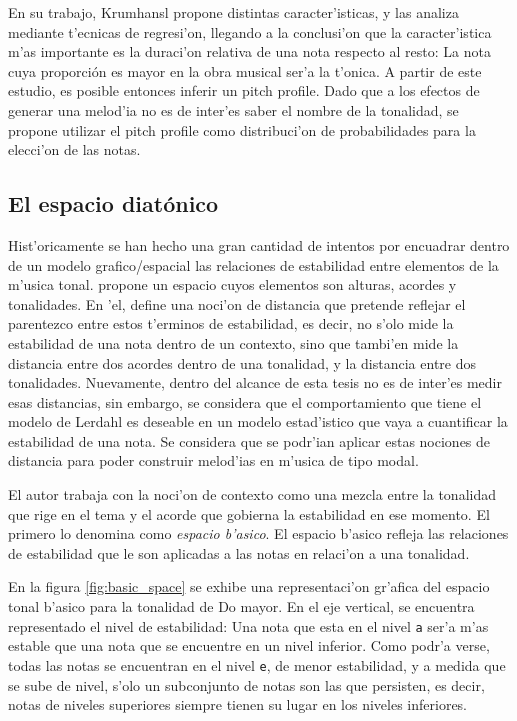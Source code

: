 En su trabajo, Krumhansl propone distintas caracter'isticas, y las analiza mediante t'ecnicas de regresi'on, llegando a la conclusi'on que la
caracter'istica m'as importante es la duraci'on relativa de una nota respecto al resto: La nota cuya proporci\'on es mayor en la obra musical ser'a la t'onica. 
A partir de este estudio, es posible entonces inferir un pitch profile. Dado que a los efectos de generar una melod'ia no es de inter'es saber el nombre de la 
tonalidad, se propone utilizar el pitch profile como distribuci'on de probabilidades para la elecci'on de las notas.

\subsection{El espacio diat\'onico}
Hist'oricamente se han hecho una gran cantidad de intentos por encuadrar dentro de un modelo grafico/espacial las relaciones de estabilidad entre elementos de la m'usica
tonal.  \cite{Lerdahl2001} propone un espacio cuyos elementos son alturas, acordes y tonalidades. En 'el, define una noci'on de distancia que pretende 
reflejar el parentezco entre estos t'erminos de estabilidad, es decir, no s'olo mide la estabilidad de una nota dentro de un contexto, 
sino que tambi'en mide la distancia entre dos acordes dentro de una tonalidad, y la distancia entre dos tonalidades. 
Nuevamente, dentro del alcance de esta tesis no es de inter'es medir esas distancias, sin embargo, se considera que el comportamiento que tiene el modelo de Lerdahl es deseable en un modelo estad'istico
que vaya a cuantificar la estabilidad de una nota. Se considera que se podr'ian aplicar estas nociones de distancia para poder construir melod'ias en m'usica de 
tipo modal.

El autor trabaja con la noci'on de contexto como una mezcla entre la tonalidad que rige en el tema  y el
acorde que gobierna la estabilidad en ese momento. El primero lo denomina como \emph{espacio b'asico}. 
El espacio b'asico refleja las relaciones de estabilidad que le son aplicadas a las notas en relaci'on a una tonalidad. 

En la figura \ref{fig:basic_space} se exhibe una representaci'on gr'afica del espacio tonal b'asico para la tonalidad de Do mayor. En el eje vertical, se encuentra
representado el nivel de estabilidad: Una nota que esta en el nivel \texttt{a} ser'a m'as estable que una nota que se encuentre en un nivel inferior. Como 
podr'a verse, todas las notas se encuentran en el nivel \texttt{e}, de menor estabilidad, y a medida que se sube de nivel, s'olo un subconjunto de notas son las 
que persisten, es decir, notas de niveles superiores siempre tienen su lugar en los niveles inferiores.

